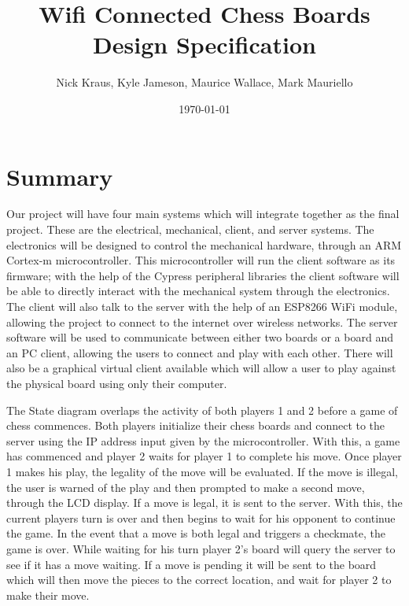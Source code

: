 \documentclass[12pt]{article}
\title{Wifi Connected Chess Boards \\ \large Design Specification}
\author{Nick Kraus, Kyle Jameson, Maurice Wallace, Mark Mauriello}
\date{\today}
\begin{document}
\maketitle

\newpage

\section*{Summary}
\indent

Our project will have four main systems which will integrate together as the final project. These are the electrical, mechanical, client, and server systems. The electronics will be designed to control the mechanical hardware, through an ARM Cortex-m microcontroller. This microcontroller will run the client software as its firmware; with the help of the Cypress peripheral libraries the client software will be able to directly interact with the mechanical system through the electronics. The client will also talk to the server with the help of an ESP8266 WiFi module, allowing the project to connect to the internet over wireless networks. The server software will be used to communicate between either two boards or a board and an PC client, allowing the users to connect and play with each other. There will also be a graphical virtual client available which will allow a user to play against the physical board using only their computer.

\indent

The State diagram overlaps the activity of both players 1 and 2 before a game of chess commences. Both players initialize their chess boards and connect to the server using the IP address input given by the microcontroller. With this, a game has commenced and player 2 waits for player 1 to complete his move. Once player 1 makes his play, the legality of the move will be evaluated. If the move is illegal, the user is warned of the play and then prompted to make a second move, through the LCD display. If a move is legal, it is sent to the server. With this, the current players turn is over and then begins to wait for his opponent to continue the game. In the event that a move is both legal and triggers a checkmate, the game is over. While waiting for his turn player 2's board will query the server to see if it has a move waiting. If a move is pending it will be sent to the board which will then move the pieces to the correct location, and wait for player 2 to make their move.

\vspace*{5mm}
\end{document}
